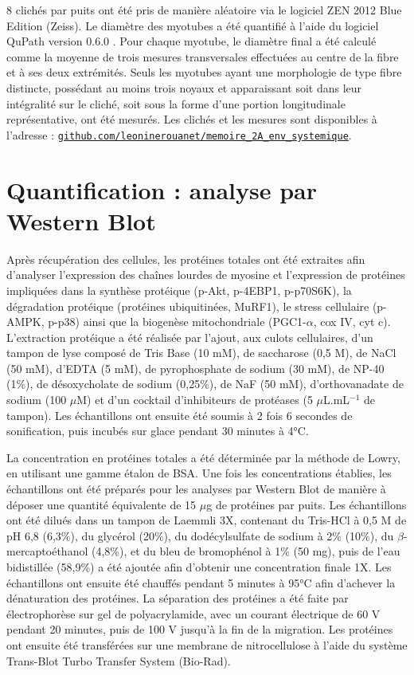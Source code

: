 \documentclass[11pt]{report}
\begin{document}
8 clichés par puits ont été pris de manière aléatoire via le logiciel ZEN 2012 Blue Edition (Zeiss). Le diamètre des myotubes a été quantifié à l'aide du logiciel QuPath version 0.6.0 \parencite{Bankhead2017Dec}. Pour chaque myotube, le diamètre final a été calculé comme la moyenne de trois mesures transversales effectuées au centre de la fibre et à ses deux extrémités. Seuls les myotubes ayant une morphologie de type fibre distincte, possédant au moins trois noyaux et apparaissant soit dans leur intégralité sur le cliché, soit sous la forme d'une portion longitudinale représentative, ont été mesurés. Les clichés et les mesures sont disponibles à l'adresse : \href{https://github.com/leoninerouanet/memoire_2A_env_systemique}{\texttt{github.com/leoninerouanet/memoire\_2A\_env\_systemique}}.

\section{Quantification : analyse par Western Blot}
\label{subsec:WB}
Après récupération des cellules, les protéines totales ont été extraites afin d'analyser l'expression des chaînes lourdes de myosine et l'expression de protéines impliquées dans la synthèse protéique (p-Akt, p-4EBP1, p-p70S6K), la dégradation protéique (protéines ubiquitinées, MuRF1), le stress cellulaire (p-AMPK, p-p38) ainsi que la biogenèse mitochondriale (PGC1-$\alpha$, cox IV, cyt c). L'extraction protéique a été réalisée par l'ajout, aux culots cellulaires, d'un tampon de lyse composé de Tris Base (10 mM), de saccharose (0,5 M), de NaCl (50 mM), d'EDTA (5 mM), de pyrophosphate de sodium (30 mM), de NP-40 (1\%), de désoxycholate de sodium (0,25\%), de NaF (50 mM), d'orthovanadate de sodium (100 $\mu$M) et d'un cocktail d'inhibiteurs de protéases (5 $\mu$L.mL$^{-1}$ de tampon). Les échantillons ont ensuite été soumis à 2 fois 6 secondes de sonification, puis incubés sur glace pendant 30 minutes à 4°C.

La concentration en protéines totales a été déterminée par la méthode de Lowry, en utilisant une gamme étalon de BSA. Une fois les concentrations établies, les échantillons ont été préparés pour les analyses par Western Blot de manière à déposer une quantité équivalente de 15 $\mu$g de protéines par puits. Les échantillons ont été dilués dans un tampon de Laemmli 3X, contenant du Tris-HCl à 0,5 M de pH 6,8 (6,3\%), du glycérol (20\%), du dodécylsulfate de sodium à 2\% (10\%), du $\beta$-mercaptoéthanol (4,8\%), et du bleu de bromophénol à 1\% (50 mg), puis de l'eau bidistillée (58,9\%) a été ajoutée afin d'obtenir une concentration finale 1X. Les échantillons ont ensuite été chauffés pendant 5 minutes à 95°C afin d'achever la dénaturation des protéines. La séparation des protéines a été faite par électrophorèse sur gel de polyacrylamide, avec un courant électrique de 60 V pendant 20 minutes, puis de 100 V jusqu'à la fin de la migration. Les protéines ont ensuite été transférées sur une membrane de nitrocellulose à l'aide du système Trans-Blot Turbo Transfer System (Bio-Rad).
\end{document}
